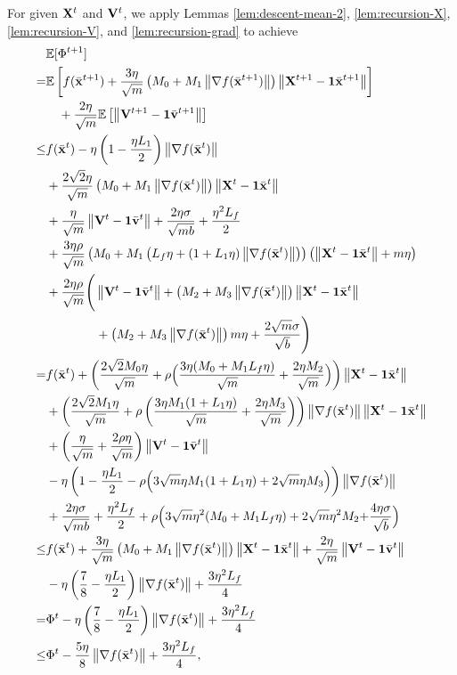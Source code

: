 \documentclass[sigconf]{acmart}
\newcommand{\Norm}[1]{\left\| #1 \right\|}
\def\vone{{\bf{1}}}
\def\vv{{\bf{v}}}
\def\vx{{\bf{x}}}
\def\BE{{\mathbb{E}}}
\def\mV {{\bf V}}
\def\mX {{\bf X}}
\theoremstyle{plain}
\def\bx{{\bar\vx}}
\def\bv{{\bar\vv}}
\begin{document}
For given $\mX^t$ and $\mV^t$, 
we apply Lemmas \ref{lem:descent-mean-2}, \ref{lem:recursion-X}, \ref{lem:recursion-V}, and \ref{lem:recursion-grad} to achieve
\begin{align*}    
& \BE[\Phi^{t+1}] \\
= & \BE\left[f(\bx^{t+1}) + \frac{3\eta}{\sqrt{m}}\left(M_0 + M_1\Norm{\nabla f(\bx^{t+1})}\right)\Norm{\mX^{t+1}-\vone\bx^{t+1}}\right] \\
& \quad+ \frac{2\eta}{\sqrt{m}}\BE\left[\Norm{\mV^{t+1}-\vone\bv^{t+1}}\right] \\
\leq & f(\bx^t) - \eta\left(1 - \frac{\eta L_1}{2}\right)\Norm{\nabla f(\bx^t)} \\
&  + \frac{2\sqrt{2}\eta}{\sqrt{m}}\left(M_0 + M_1\Norm{\nabla f(\bx^t)}\right)\Norm{\mX^t-\vone\bx^t} \\
& + \frac{\eta}{\sqrt{m}}\Norm{\mV^t - \vone\bv^t} + \frac{2\eta\sigma}{\sqrt{mb}}
+ \frac{\eta^2L_f}{2} \\
&  + \frac{3\eta\rho}{\sqrt{m}}\left(M_0 + M_1\left(L_f\eta + \left(1+L_1\eta\right)\Norm{\nabla f(\bx^{t})}\right)\right)\left(\Norm{\mX^t - \vone\bx^t} + m\eta\right) \\
 &  + \frac{2\eta\rho}{\sqrt{m}}\Bigg(\Norm{\mV^t - \vone\bv^t} + \left(M_2 + M_3\Norm{\nabla f(\bx^{t})}\right)\Norm{\mX^t - \vone\bx^t} \\
 & \qquad\quad\quad + \left(M_2 + M_3\Norm{\nabla f(\bx^{t})}\right) m\eta + \frac{2\sqrt{m}\sigma}{\sqrt{b}}\Bigg) \\
 = & f(\bx^t)  + \left(\frac{2\sqrt{2}M_0\eta}{\sqrt{m}} + \rho\Big(\frac{3\eta(M_0 + M_1L_f\eta)}{\sqrt{m}} + \frac{2\eta M_2}{\sqrt{m}}\Big)\right)\Norm{\mX^t-\vone\bx^t} \\
 & + \left(\frac{2\sqrt{2}M_1\eta}{\sqrt{m}} + \rho\left(\frac{3\eta M_1(1 + L_1\eta)}{\sqrt{m}} + \frac{2\eta M_3}{\sqrt{m}}\right)\right)\Norm{\nabla f(\bx^t)}\Norm{\mX^t-\vone\bx^t} \\
 & + \left(\frac{\eta}{\sqrt{m}}+\frac{2\rho\eta}{\sqrt{m}}\right)\Norm{\mV^t-\vone\bv^t} \\
 & - \eta\left(1 - \frac{\eta L_1}{2} - \rho\Big(3\sqrt{m}\eta M_1(1 + L_1\eta) + 2\sqrt{m}\eta M_3\Big)\right)\Norm{\nabla f(\bx^t)} \\
 & + \frac{2\eta\sigma}{\sqrt{mb}}  + \frac{\eta^2L_f}{2}  + \rho\Big(3\sqrt{m}\eta^2(M_0 + M_1L_f\eta) + 2\sqrt{m}\eta^2M_2{+\frac{4\eta\sigma}{\sqrt{b}}}\Big)  \\
\leq & f(\bx^t)  + \frac{3\eta}{\sqrt{m}}\left(M_0 + M_1\Norm{\nabla f(\bx^t)}\right)\Norm{\mX^t-\vone\bx^t} + \frac{2\eta}{\sqrt{m}}\Norm{\mV^t-\vone\bv^t}   \\
& - \eta\left(\frac{7}{8} - \frac{\eta L_1}{2}\right)\Norm{\nabla f(\bx^t)} + \frac{3\eta^2L_f}{4} \\
= & \Phi^t - \eta\left(\frac{7}{8} - \frac{\eta L_1}{2}\right)\Norm{\nabla f(\bx^t)} + \frac{3\eta^2L_f}{4} \\
\leq & \Phi^t - \frac{5\eta}{8}\Norm{\nabla f(\bx^t)} + \frac{3\eta^2L_f}{4},
\end{align*}
\end{document}
